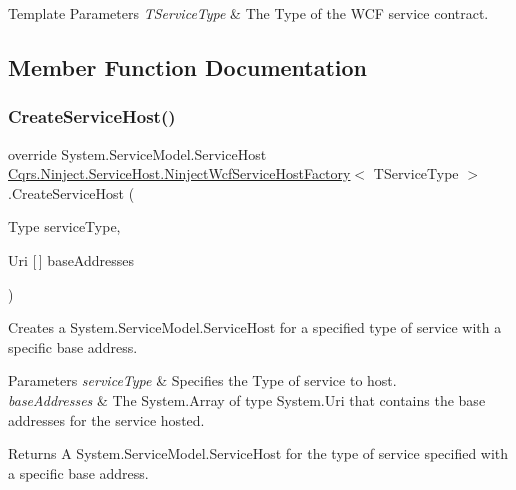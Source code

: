 \begin{DoxyTemplParams}{Template Parameters}
{\em T\+Service\+Type} & The Type of the W\+CF service contract.\\
\hline
\end{DoxyTemplParams}


\subsection{Member Function Documentation}
\mbox{\label{classCqrs_1_1Ninject_1_1ServiceHost_1_1NinjectWcfServiceHostFactory_aea8f1d5ab6287ef4abf7145d5467cdd5_aea8f1d5ab6287ef4abf7145d5467cdd5}} 
\subsubsection{\texorpdfstring{Create\+Service\+Host()}{CreateServiceHost()}}
{\footnotesize\ttfamily override System.\+Service\+Model.\+Service\+Host \hyperlink{classCqrs_1_1Ninject_1_1ServiceHost_1_1NinjectWcfServiceHostFactory}{Cqrs.\+Ninject.\+Service\+Host.\+Ninject\+Wcf\+Service\+Host\+Factory}$<$ T\+Service\+Type $>$.Create\+Service\+Host (\begin{DoxyParamCaption}\item[{Type}]{service\+Type,  }\item[{Uri \mbox{[}$\,$\mbox{]}}]{base\+Addresses }\end{DoxyParamCaption})\hspace{0.3cm}{\ttfamily [protected]}}



Creates a System.\+Service\+Model.\+Service\+Host for a specified type of service with a specific base address. 


\begin{DoxyParams}{Parameters}
{\em service\+Type} & Specifies the Type of service to host.\\
\hline
{\em base\+Addresses} & The System.\+Array of type System.\+Uri that contains the base addresses for the service hosted.\\
\hline
\end{DoxyParams}
\begin{DoxyReturn}{Returns}
A System.\+Service\+Model.\+Service\+Host for the type of service specified with a specific base address.
\end{DoxyReturn}
